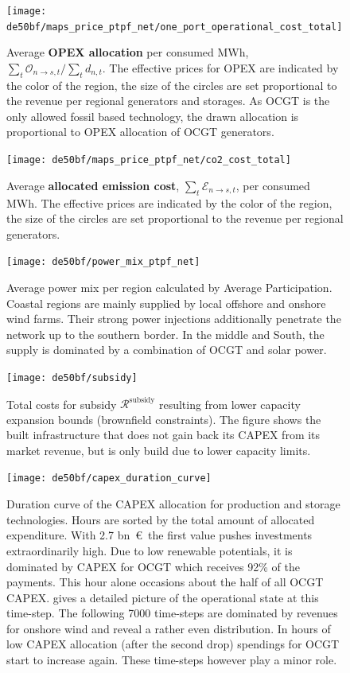 \documentclass[11pt,twocolumn]{article}
\newcommand{\demand}[1][n]{d_{#1,t}}
\newcommand{\opex}{\mathcal{O}}
\newcommand{\emissioncost}{\mathcal{E}}
\newcommand{\remainingcost}{\mathcal{R}}
\newcommand{\subsidycost}{\remainingcost^\text{subsidy}}
\newcommand{\allocateopex}[1][n \rightarrow s]{\opex_{#1,t}}
\newcommand{\allocateemissioncost}[1][n \rightarrow s]{\emissioncost_{#1,t}}
\begin{document}
\begin{figure}
    \texttt{[image: de50bf/maps\_price\_ptpf\_net/one\_port\_operational\_cost\_total]}
    \caption{Average \textbf{OPEX allocation} per consumed MWh, $\sum_t \allocateopex/\sum_t \demand$. The effective prices for OPEX are indicated by the color of the region, the size of the circles are set proportional to the revenue per regional generators and storages. As OCGT is the only allowed fossil based technology, the drawn allocation is proportional to OPEX allocation of OCGT generators.}
    \label{fig:opex_price}
\end{figure}


\begin{figure}
    \texttt{[image: de50bf/maps\_price\_ptpf\_net/co2\_cost\_total]}
    \caption{Average \textbf{allocated emission cost}, $\sum_t \allocateemissioncost$, per consumed MWh. The effective prices are indicated by the color of the region, the size of the circles are set proportional to the revenue per regional generators.}
    \label{fig:emission_cost}
\end{figure}


\begin{figure}
    \texttt{[image: de50bf/power\_mix\_ptpf\_net]}
    \caption{Average power mix per region calculated by Average Participation. Coastal regions are mainly supplied by local offshore and onshore wind farms. Their strong power injections additionally penetrate the network up to the southern border. In the middle and South, the supply is dominated by a combination of OCGT and solar power.}
    \label{fig:power_mix}
\end{figure}

\begin{figure}
    \vspace{2cm}
    \texttt{[image: de50bf/subsidy]}
    \caption{Total costs for subsidy $\subsidycost$ resulting from lower capacity expansion bounds (brownfield constraints). The figure shows the built infrastructure that does not gain back its CAPEX from its market revenue, but is only build due to lower capacity limits.}
    \label{fig:subsidy}
\end{figure}


\begin{figure}
    \texttt{[image: de50bf/capex\_duration\_curve]}
    \caption{Duration curve of the CAPEX allocation for production and storage technologies. Hours are sorted by the total amount of allocated expenditure. With 2.7 bn~\euro\, the first value pushes investments extraordinarily high. Due to low renewable potentials, it is dominated by CAPEX for OCGT which receives 92\% of the payments. This hour alone occasions about the half of all OCGT CAPEX.  gives a detailed picture of the operational state at this time-step. The following 7000 time-steps are dominated by revenues for onshore wind and reveal a rather even distribution. In hours of low CAPEX allocation (after the second drop) spendings for OCGT start to increase again. These time-steps however play a minor role.}
    \label{fig:capex_duration_curve}
\end{figure}
\end{document}
